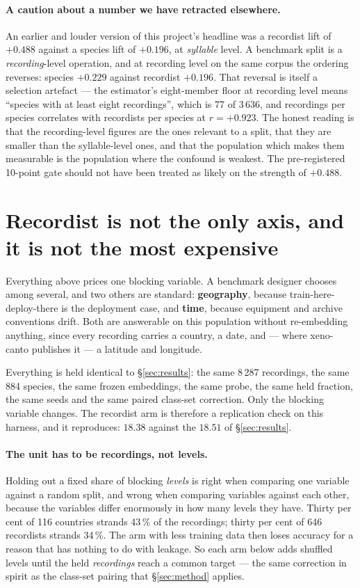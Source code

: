 \documentclass[10pt,twocolumn,a4paper]{article}
\begin{document}
\paragraph{A caution about a number we have retracted elsewhere.} An earlier and louder
version of this project's headline was a recordist lift of $+0.488$ against a species lift of
$+0.196$, at \emph{syllable} level. A benchmark split is a \emph{recording}-level operation,
and at recording level on the same corpus the ordering reverses: species $+0.229$ against
recordist $+0.196$. That reversal is itself a selection artefact --- the estimator's
eight-member floor at recording level means ``species with at least eight recordings'', which
is 77 of 3\,636, and recordings per species correlates with recordists per species at
$r = +0.923$. The honest reading is that the recording-level figures are the ones relevant to
a split, that they are smaller than the syllable-level ones, and that the population which
makes them measurable is the population where the confound is weakest. The pre-registered
10-point gate should not have been treated as likely on the strength of $+0.488$.

\section{Recordist is not the only axis, and it is not the most expensive}
\label{sec:axes}

Everything above prices one blocking variable. A benchmark designer chooses among several, and
two others are standard: \textbf{geography}, because train-here-deploy-there is the deployment
case, and \textbf{time}, because equipment and archive conventions drift. Both are answerable on
this population without re-embedding anything, since every recording carries a country, a
date, and --- where xeno-canto publishes it --- a latitude and longitude.

Everything is held identical to \S\ref{sec:results}: the same 8\,287 recordings, the same 884
species, the same frozen embeddings, the same probe, the same held fraction, the same seeds and
the same paired class-set correction. Only the blocking variable changes. The recordist arm is
therefore a replication check on this harness, and it reproduces: $18.38$ against the $18.51$
of \S\ref{sec:results}.

\paragraph{The unit has to be recordings, not levels.} Holding out a fixed share of blocking
\emph{levels} is right when comparing one variable against a random split, and wrong when
comparing variables against each other, because the variables differ enormously in how many
levels they have. Thirty per cent of 116 countries strands 43\,\% of the recordings; thirty per
cent of 646 recordists strands 34\,\%. The arm with less training data then loses accuracy for
a reason that has nothing to do with leakage. So each arm below adds shuffled levels until the
held \emph{recordings} reach a common target --- the same correction in spirit as the class-set
pairing that \S\ref{sec:method} applies.
\end{document}
